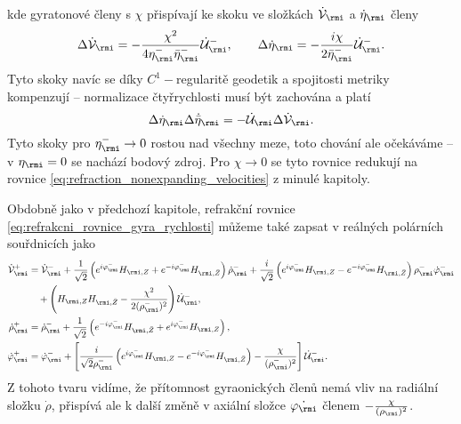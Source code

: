 kde gyratonové členy s $\chi$ přispívají ke skoku ve složkách $\dot{\matv}_{\rmi}$ a $\dot{\eta}_{\rmi}$ členy
\begin{equation}
    \Delta \dot{\matv}_{\rmi} = -\frac{\chi^2}{4 \eta_{\rmi}^{-} \bar{\eta}_{\rmi}^{-}} \dot{\matu}_{\rmi}^{-}, ~~~~~~ \Delta \dot{\eta}_{\rmi} = -\frac{i \chi}{2 \bar{\eta}_{\rmi}^{-}} \dot{\matu}_{\rmi}^{-}.
\end{equation}
Tyto skoky navíc se díky $C^1-$regularitě geodetik a spojitosti metriky kompenzují -- normalizace čtyřrychlosti musí být zachována a platí
\begin{equation}
    \Delta \dot{\eta}_{\rmi} \Delta \dot{\bar{\eta}}_{\rmi} = - \dot{\matu}_{\rmi} \Delta \dot{\matv}_{\rmi}.
\end{equation}
Tyto skoky pro $\eta_{\rmi}^{-} \to 0$ rostou nad všechny meze, toto chování ale očekáváme -- v $\eta_{\rmi} = 0$ se nachází bodový zdroj.
Pro $\chi \to 0$ se tyto rovnice redukují na rovnice \eqref{eq:refraction_nonexpanding_velocities} z minulé kapitoly.

Obdobně jako v předchozí kapitole, refrakční rovnice \eqref{eq:refrakcni_rovnice_gyra_rychlosti} můžeme také zapsat v reálných
polárních souřdnicích jako
\begin{equation}
    \begin{split}
    \dot{\matv}_{\rmi}^{+} &= \dot{\matv}_{\rmi}^{-} + \halfsqrt \left(e^{i \varphi_{\rmi}^{-}} H_{\rmi, Z} + e^{-i \varphi_{\rmi}^{-}} H_{\rmi, \bar{Z}}\right) \dot{\rho}_{\rmi}^{-} +
    \frac{i}{\sqrt{2}} \left( e^{i \varphi_{\rmi}^{-}} H_{\rmi, Z} - e^{-i \varphi_{\rmi}^{-}} H_{\rmi, \bar{Z}} \right) \rho_{\rmi}^{-} \dot{\varphi}_{\rmi}^{-} \\
    &~~~+ \left(H_{\rmi, Z} H_{\rmi, \bar{Z}} - \frac{\chi^2}{2(\rho_{\rmi}^{-})^2}\right)\dot{\matu}_{\rmi}^{-}, \\
    \dot{\rho}_{\rmi}^{+} &= \dot{\rho}_{\rmi}^{-} + \halfsqrt \left(e^{-i \varphi_{\rmi}^{-}} H_{\rmi, \bar{Z}} + e^{i \varphi_{\rmi}^{-}} H_{\rmi, Z} \right), \\
    \dot{\varphi}_{\rmi}^{+} &= \dot{\varphi}_{\rmi}^{-} + \left[ \frac{i}{\sqrt{2} \rho_{\rmi}^{-}} \left(e^{i \varphi_{\rmi}^{-}} H_{\rmi, Z} - e^{-i \varphi_{\rmi}^{-}} H_{\rmi, \bar{Z}} \right) - \frac{\chi}{(\rho_{\rmi}^{-})^2}\right] \dot{\matu}_{\rmi}^{-}.
    \end{split}
\end{equation}
Z tohoto tvaru vidíme, že přítomnost gyraonických členů nemá vliv na radiální složku $\dot{\rho}$, přispívá ale k další změně v
axiální složce $\dot{\varphi_{\rmi}}$ členem $-\frac{\chi}{(\rho_{\rmi})^2}$.
